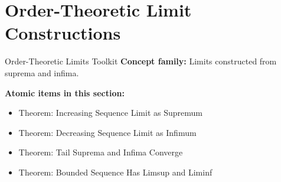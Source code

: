 \section{Order-Theoretic Limit Constructions}

\begin{toolkitbox}{Order-Theoretic Limits Toolkit}
\textbf{Concept family:} Limits constructed from suprema and infima.

\medskip
\textbf{Atomic items in this section:}
\begin{itemize}
  \item Theorem: Increasing Sequence Limit as Supremum
  \item Theorem: Decreasing Sequence Limit as Infimum
  \item Theorem: Tail Suprema and Infima Converge
  \item Theorem: Bounded Sequence Has Limsup and Liminf
\end{itemize}
\end{toolkitbox}


